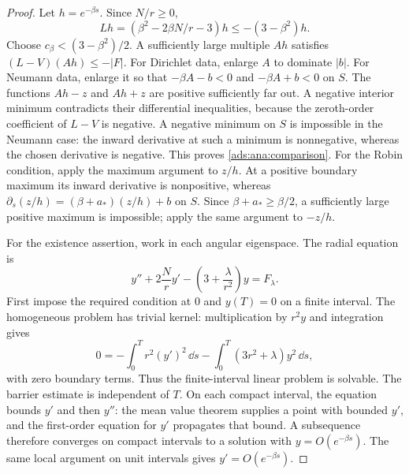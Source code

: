 \begin{proof}
Let $h=e^{-\beta s}$.  Since $N/r\geq0$,
\[
  Lh=(\beta^2-2\beta N/r-3)h
       \leq-(3-\beta^2)h.
\]
Choose $c_\beta<(3-\beta^2)/2$.  A sufficiently large multiple
$Ah$ satisfies $(L-V)(Ah)\leq-|F|$.  For Dirichlet data, enlarge
$A$ to dominate $|b|$.  For Neumann data, enlarge it so that
$-\beta A-b<0$ and $-\beta A+b<0$ on $S$.
The functions $Ah-z$ and $Ah+z$ are positive sufficiently far out.
A negative interior minimum contradicts their differential inequalities,
because the zeroth-order coefficient of $L-V$ is negative.
A negative minimum on $S$ is impossible in the Neumann case: the
inward derivative at such a minimum is nonnegative, whereas the
chosen derivative is negative.  This proves \eqref{ads:ana:comparison}.
For the Robin condition, apply the maximum argument to $z/h$.
At a positive boundary maximum its inward derivative is nonpositive,
whereas
$\partial_s(z/h)=(\beta+a_*)(z/h)+b$ on $S$.
Since $\beta+a_*\geq\beta/2$, a sufficiently large positive maximum
is impossible; apply the same argument to $-z/h$.

For the existence assertion, work in each angular eigenspace.  The
radial equation is
\begin{equation}
 y''+2\frac Nr y'-\left(3+\frac\lambda{r^2}\right)y=F_\lambda.
 \label{ads:ana:radial-ode}
\end{equation}
First impose the required condition at $0$ and $y(T)=0$ on a finite
interval.  The homogeneous problem has trivial kernel: multiplication
by $r^2y$ and integration gives
\[
  0=-\int_0^T r^2(y')^2\,\dd s
    -\int_0^T(3r^2+\lambda)y^2\,\dd s,
\]
with zero boundary terms.  Thus the finite-interval linear problem is
solvable.  The barrier estimate is independent of $T$.  On each compact
interval, the equation bounds $y'$ and then $y''$: the mean value
theorem supplies a point with bounded $y'$, and the first-order equation
for $y'$ propagates that bound.  A subsequence therefore converges on
compact intervals to a solution with $y=O(e^{-\beta s})$.
The same local argument on unit intervals gives
$y'=O(e^{-\beta s})$.


\end{proof}
